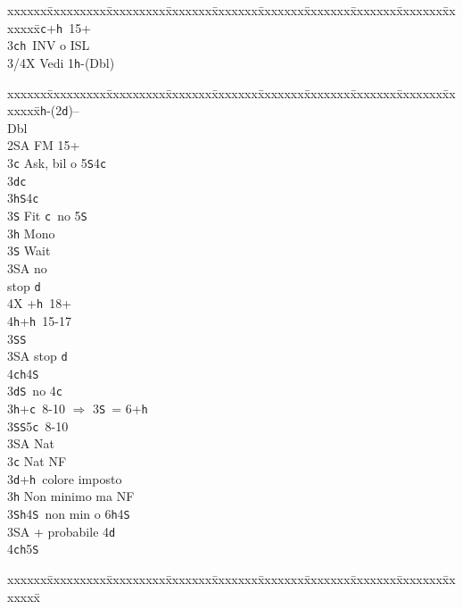 \documentclass[a4paper,italian]{article}
\newcommand{\BS}{\small{\texttt{S}}}
\newcommand{\BC}{\small{\texttt{c}}}
\newcommand{\BD}{\small{\texttt{d}}}
\newcommand{\BH}{\small{\texttt{h}}}
\newenvironment{bidtable}
{\begin{tabbing}

    xxxxxx\=xxxxxxxxx\=xxxxxxxxx\=xxxxxxx\=xxxxxxx\=xxxxxxx\=xxxxxxx\=xxxxxxx\=xxxxxxx\=xxxxxxx\=\kill}
{\end{tabbing} }%
\begin{document}
\begin{multicols}{2}
\begin{bidtable}
        3\BC {}+\BH\ 15+\-\\
        3\BC{}\BH\ INV o ISL\\
        3/4X \> Vedi 1\BH -(Dbl)\-
    \end{bidtable}
    \columnbreak
    \begin{bidtable}
        1\BH-(2\BD)--\+\\
        Dbl\+\\
        2\small{SA} \> FM 15+\+\\
        3\BC \> Ask, bil o 5\BS4\BC\+\\
        3\BD {}\BC \+\\
        3\BH {}\BS 4\BC \\
        3\BS \> Fit \BC\ no 5\BS \-\\
        3\BH \> Mono\+\\
        3\BS \> Wait\+\\
        3\small{SA}  no\+\\\-stop \BD \\
        4X +\BH\ 18+\\
        4\BH {}+\BH\ 15-17\-\-\\
        3\BS {}\BS \\
        3\small{SA}  stop \BD \\
        4\BC {}\BH 4\BS \-\\
        3\BD {}\BS\ no 4\BC \\
        3\BH {}+\BC\ 8-10 $\Rightarrow$ 3\BS\ = 6+\BH\\
        3\BS {}\BS 5\BC\ 8-10\\
        3\small{SA} \> Nat\-\\
        3\BC \> Nat NF\\
        3\BD {}+\BH\ colore imposto\\
        3\BH \> Non minimo ma NF\\
        3\BS {}\BH 4\BS\ non min o 6\BH 4\BS \\
        3\small{SA} + probabile 4\BD \\
        4\BC {}\BH 5\BS \-\\
    \end{bidtable}
    \columnbreak
    \begin{bidtable}


\end{bidtable}
\end{multicols}
\end{document}
